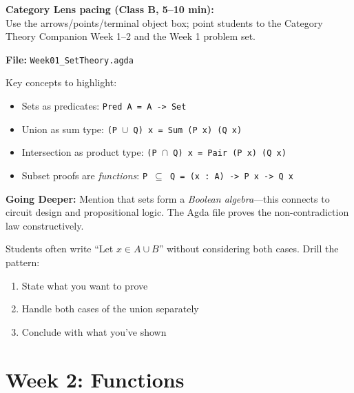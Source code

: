 \documentclass[11pt]{article}
\begin{document}
\textbf{Category Lens pacing (Class B, 5--10 min):}\\
Use the arrows/points/terminal object box; point students to the Category Theory Companion Week 1--2 and the Week 1 problem set.

\begin{agdabox}
\textbf{File:} \texttt{Week01\_SetTheory.agda}

Key concepts to highlight:
\begin{itemize}
    \item Sets as predicates: \texttt{Pred A = A -> Set}
    \item Union as sum type: \texttt{(P $\cup$ Q) x = Sum (P x) (Q x)}
    \item Intersection as product type: \texttt{(P $\cap$ Q) x = Pair (P x) (Q x)}
    \item Subset proofs are \textit{functions}: \texttt{P $\subseteq$ Q = (x : A) -> P x -> Q x}
\end{itemize}

\textbf{Going Deeper:} Mention that sets form a \textit{Boolean algebra}---this connects to circuit design and propositional logic. The Agda file proves the non-contradiction law constructively.
\end{agdabox}

\begin{tipbox}
Students often write ``Let $x \in A \cup B$'' without considering both cases. Drill the pattern:
\begin{enumerate}
    \item State what you want to prove
    \item Handle both cases of the union separately
    \item Conclude with what you've shown
\end{enumerate}
\end{tipbox}

\newpage
\section{Week 2: Functions}
\end{document}
